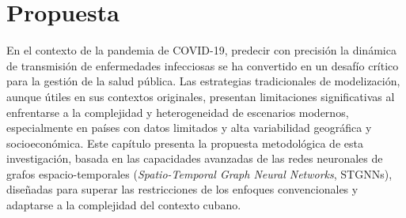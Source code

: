 \chapter{Propuesta}\label{chapter:proposal}

En el contexto de la pandemia de COVID-19, predecir con precisión la dinámica de transmisión de enfermedades infecciosas se ha convertido en un desafío crítico para la gestión de la salud pública. Las estrategias tradicionales de modelización, aunque útiles en sus contextos originales, presentan limitaciones significativas al enfrentarse a la complejidad y heterogeneidad de escenarios modernos, especialmente en países con datos limitados y alta variabilidad geográfica y socioeconómica. Este capítulo presenta la propuesta metodológica de esta investigación, basada en las capacidades avanzadas de las redes neuronales de grafos espacio-temporales (\textit{Spatio-Temporal Graph Neural Networks}, STGNNs), diseñadas para superar las restricciones de los enfoques convencionales y adaptarse a la complejidad del contexto cubano.




